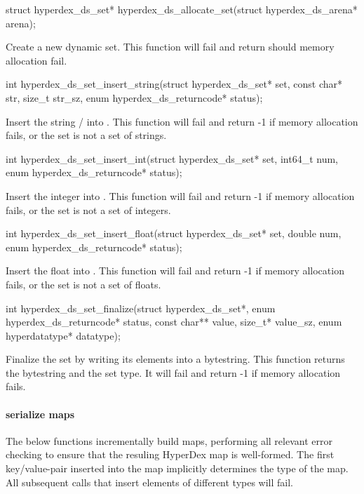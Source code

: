 \begin{ccode}
struct hyperdex_ds_set* hyperdex_ds_allocate_set(struct hyperdex_ds_arena* arena);
\end{ccode}
Create a new dynamic set.  This function will fail and return
 should memory allocation fail.

\begin{ccode}
int hyperdex_ds_set_insert_string(struct hyperdex_ds_set* set,
                                  const char* str, size_t str_sz,
                                  enum hyperdex_ds_returncode* status);
\end{ccode}
Insert the string / into .  This
function will fail and return -1 if memory allocation fails, or the set is not a
set of strings.

\begin{ccode}
int hyperdex_ds_set_insert_int(struct hyperdex_ds_set* set, int64_t num,
                               enum hyperdex_ds_returncode* status);
\end{ccode}
Insert the integer  into .  This function will
fail and return -1 if memory allocation fails, or the set is not a set of
integers.

\begin{ccode}
int hyperdex_ds_set_insert_float(struct hyperdex_ds_set* set, double num,
                                 enum hyperdex_ds_returncode* status);
\end{ccode}
Insert the float  into .  This function will fail
and return -1 if memory allocation fails, or the set is not a set of floats.

\begin{ccode}
int hyperdex_ds_set_finalize(struct hyperdex_ds_set*,
                             enum hyperdex_ds_returncode* status,
                             const char** value, size_t* value_sz,
                             enum hyperdatatype* datatype);
\end{ccode}
Finalize the set by writing its elements into a bytestring.  This
function returns the bytestring and the set type.  It will fail and return -1 if
memory allocation fails.

\paragraph{serialize maps}

The below functions incrementally build maps, performing all relevant error
checking to ensure that the resuling HyperDex map is well-formed.  The first
key/value-pair inserted into the map implicitly determines the type of the map.  All
subsequent calls that insert elements of different types will fail.

